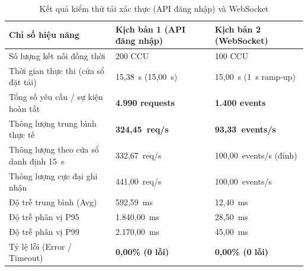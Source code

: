 \documentclass{IEEEtran}
\begin{document}
\begin{table}[t]
\caption{Kết quả kiểm thử tải xác thực (API đăng nhập) và WebSocket}
\label{tab:stress_results}
\centering
\scriptsize
\setlength{\tabcolsep}{3pt}
\begin{tabularx}{\columnwidth}{|Y|C{2.25cm}|C{2.2cm}|}
\hline
\textbf{Chỉ số hiệu năng} & \textbf{Kịch bản 1 (API đăng nhập)} & \textbf{Kịch bản 2 (WebSocket)} \\
\hline
Số lượng kết nối đồng thời & 200 CCU & 100 CCU \\
Thời gian thực thi (cửa sổ đặt tải) & 15,38~s (15,00~s) & 15,00~s (1~s ramp-up) \\
Tổng số yêu cầu / sự kiện hoàn tất & \textbf{4.990 requests} & \textbf{1.400 events} \\
Thông lượng trung bình thực tế & \textbf{324,45~req/s} & \textbf{93,33~events/s} \\
Thông lượng theo cửa sổ danh định 15~s & 332,67~req/s & 100,00~events/s (đỉnh) \\
Thông lượng cực đại ghi nhận & 441,00~req/s & 100,00~events/s \\
Độ trễ trung bình (Avg) & 592,59~ms & 12,40~ms \\
Độ trễ phân vị P95 & 1.840,00~ms & 28,50~ms \\
Độ trễ phân vị P99 & 2.170,00~ms & 45,00~ms \\
Tỷ lệ lỗi (Error / Timeout) & \textbf{0,00\% (0 lỗi)} & \textbf{0,00\% (0 lỗi)} \\
\hline
\end{tabularx}
\end{table}
\end{document}
